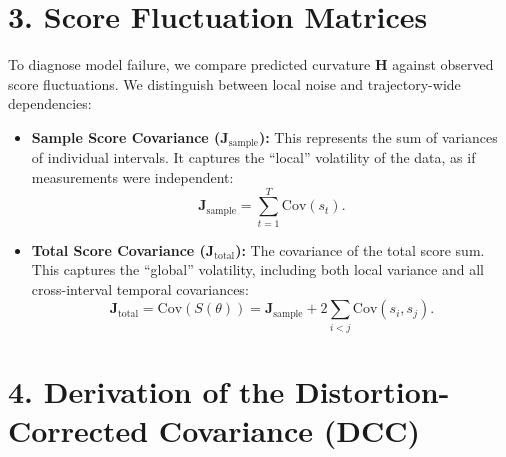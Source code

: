 \documentclass[11pt]{article}
\begin{document}
\section*{3. Score Fluctuation Matrices}

To diagnose model failure, we compare predicted curvature $\mathbf{H}$ against observed score fluctuations. We distinguish between local noise and trajectory-wide dependencies:

\begin{itemize}
    \item \textbf{Sample Score Covariance ($\mathbf{J}_{\mathrm{sample}}$):} This represents the sum of variances of individual intervals. It captures the ``local'' volatility of the data, as if measurements were independent:
    \begin{equation}
    \mathbf{J}_{\mathrm{sample}} = \sum_{t=1}^T \mathrm{Cov}(s_t).
    \end{equation}
    \item \textbf{Total Score Covariance ($\mathbf{J}_{\mathrm{total}}$):} The covariance of the total score sum. This captures the ``global'' volatility, including both local variance and all cross-interval temporal covariances:
    \begin{equation}
    \mathbf{J}_{\mathrm{total}} = \mathrm{Cov}(S(\theta)) = \mathbf{J}_{\mathrm{sample}} + 2\sum_{i<j}\mathrm{Cov}(s_i,s_j).
    \end{equation}
\end{itemize}

\section*{4. Derivation of the Distortion-Corrected Covariance (DCC)}
\end{document}
